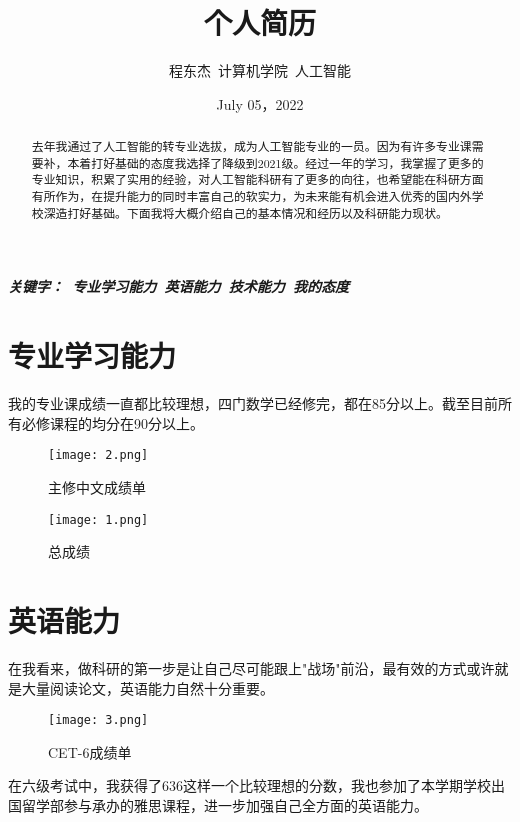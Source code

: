 \documentclass[UTF8]{ctexart}
\begin{document}
	\title{个人简历}
	\author{程东杰\ 计算机学院\ 人工智能}
	\date{July 05，2022}
	\maketitle
	\setlength{\absrightindent}{0pt}
	\newpage
	\begin{abstract}
	去年我通过了人工智能的转专业选拔，成为人工智能专业的一员。因为有许多专业课需要补，本着打好基础的态度我选择了降级到2021级。经过一年的学习，我掌握了更多的专业知识，积累了实用的经验，对人工智能科研有了更多的向往，也希望能在科研方面有所作为，在提升能力的同时丰富自己的软实力，为未来能有机会进入优秀的国内外学校深造打好基础。下面我将大概介绍自己的基本情况和经历以及科研能力现状。
	\end{abstract}

	{\bf\emph{ 关键字：\ 专业学习能力\  英语能力\ 技术能力\ 我的态度}\rm}
	\newpage
	\tableofcontents
	\newpage
	
	\section{专业学习能力}
	我的专业课成绩一直都比较理想，四门数学已经修完，都在85分以上。截至目前所有必修课程的均分在90分以上。
	\begin{figure}[H]  %
	\centering  %
	\texttt{[image: 2.png]} %
	\caption{主修中文成绩单 } %
	\label{fig:主修中文成绩单} %
	\end{figure}
	\begin{figure}[H]  %
	\centering  %
	\texttt{[image: 1.png]} %
	\caption{总成绩} %
	\label{fig:主修中文成绩单} %
	\end{figure}
	\section{英语能力}
	在我看来，做科研的第一步是让自己尽可能跟上"战场"前沿，最有效的方式或许就是大量阅读论文，英语能力自然十分重要。
	\begin{figure}[H]  %
		\centering  %
		\texttt{[image: 3.png]} %
		\caption{CET-6成绩单 } %
		\label{fig:主修中文成绩单} %
	\end{figure}
	在六级考试中，我获得了636这样一个比较理想的分数，我也参加了本学期学校出国留学部参与承办的雅思课程，进一步加强自己全方面的英语能力。
\end{document}

